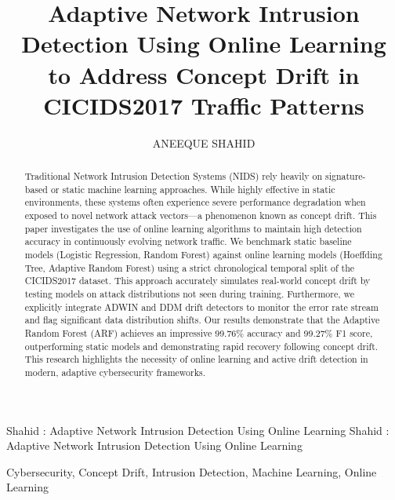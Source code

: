 \documentclass{ieeeaccess}
\begin{document}

\title{Adaptive Network Intrusion Detection Using Online Learning to Address Concept Drift in CICIDS2017 Traffic Patterns}
\author{\uppercase{Aneeque Shahid}}
\address[1]{Independent Researcher, (e-mail: aneequeshahid495@gmail.com)}

\markboth
{Shahid \headeretal: Adaptive Network Intrusion Detection Using Online Learning}
{Shahid \headeretal: Adaptive Network Intrusion Detection Using Online Learning}


\begin{abstract}
Traditional Network Intrusion Detection Systems (NIDS) rely heavily on signature-based or static machine learning approaches. While highly effective in static environments, these systems often experience severe performance degradation when exposed to novel network attack vectors---a phenomenon known as concept drift. This paper investigates the use of online learning algorithms to maintain high detection accuracy in continuously evolving network traffic. We benchmark static baseline models (Logistic Regression, Random Forest) against online learning models (Hoeffding Tree, Adaptive Random Forest) using a strict chronological temporal split of the CICIDS2017 dataset. This approach accurately simulates real-world concept drift by testing models on attack distributions not seen during training. Furthermore, we explicitly integrate ADWIN and DDM drift detectors to monitor the error rate stream and flag significant data distribution shifts. Our results demonstrate that the Adaptive Random Forest (ARF) achieves an impressive 99.76\% accuracy and 99.27\% F1 score, outperforming static models and demonstrating rapid recovery following concept drift. This research highlights the necessity of online learning and active drift detection in modern, adaptive cybersecurity frameworks.
\end{abstract}

\begin{keywords}
Cybersecurity, Concept Drift, Intrusion Detection, Machine Learning, Online Learning
\end{keywords}

\titlepgskip=-15pt

\maketitle
\end{document}
